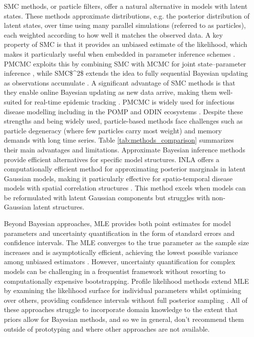 \documentclass{article}
\begin{document}
\ac{SMC} methods, or particle filters, offer a natural alternative in models with latent states. These methods approximate distributions, e.g. the posterior distribution of latent states, over time using many parallel simulations (referred to as particles), each weighted according to how well it matches the observed data. A key property of \ac{SMC} is that it provides an unbiased estimate of the likelihood, which makes it particularly useful when embedded in parameter inference schemes \citep{doucet2001introduction}. \ac{PMCMC} exploits this by combining \ac{SMC} with \ac{MCMC} for joint state–parameter inference \citep{andrieu2010particle, endo2019introduction}, while \ac{SMC$^2$} extends the idea to fully sequential Bayesian updating as observations accumulate \citep{chopin2013smc2, TEMFACK2025100847}. A significant advantage of  \ac{SMC} methods is that they enable online Bayesian updating as new data arrive, making them well-suited for real-time epidemic tracking \citep{birrell2020efficient, storvik2023sequential}. 
\ac{PMCMC} is widely used for infectious disease modelling including in the \ac{POMP} and ODIN ecosystems \citep{king2016statistical, fitzjohn2021reproducible}. Despite these strengths and being widely used, particle-based methods face challenges such as particle degeneracy (where few particles carry most weight) and memory demands with long time series. Table \ref{tab:methods_comparison} summarizes their main advantages and limitations.
Approximate Bayesian inference methods provide efficient alternatives for specific model structures.
\ac{INLA} offers a computationally efficient method for approximating posterior marginals in latent Gaussian models, making it particularly effective for spatio-temporal disease models with spatial correlation structures \citep{rue2017bayesian}.
This method excels when models can be reformulated with latent Gaussian components but struggles with non-Gaussian latent structures.

Beyond Bayesian approaches, \ac{MLE} provides both point estimates for model parameters and uncertainty quantification in the form of standard errors and confidence intervals. The \ac{MLE} converges to the true parameter as the sample size increases and is asymptotically efficient, achieving the lowest possible variance among unbiased estimators \citep{myung2003tutorial, baltazar2024maximum}. However, uncertainty quantification for complex models can be challenging in a frequentist framework without resorting to computationally expensive bootstrapping.
Profile likelihood methods extend \ac{MLE} by examining the likelihood surface for individual parameters whilst optimising over others, providing confidence intervals without full posterior sampling \citep{tonsing2018profile, plank2024structured}.
All of these approaches struggle to incorporate domain knowledge to the extent that priors allow for Bayesian methods, and so we in general, don't recommend them outside of prototyping and where other approaches are not available.
\end{document}
